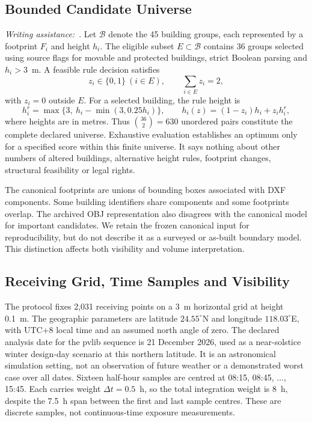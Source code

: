\documentclass{llncs}
\newcommand{\aidraft}{\textit{Writing assistance:}~\cite{openai2026}. }
\begin{document}
\subsection{Bounded Candidate Universe}
\aidraft{}Let $\mathcal{B}$ denote the 45 building groups, each represented by a footprint $F_i$ and height $h_i$. The eligible subset $E\subset\mathcal{B}$ contains 36 groups selected using source flags for movable and protected buildings, strict Boolean parsing and $h_i>3$~m. A feasible rule decision satisfies
\begin{equation}
 z_i\in\{0,1\}\ (i\in E),\qquad \sum_{i\in E}z_i=2,
 \label{eq:select}
\end{equation}
with $z_i=0$ outside $E$. For a selected building, the rule height is
\begin{equation}
 h_i^r=\max\{3,\ h_i-\min(3,0.25h_i)\},\qquad
 h_i(z)=(1-z_i)h_i+z_i h_i^r, \label{eq:height}
\end{equation}
where heights are in metres. Thus $\binom{36}{2}=630$ unordered pairs constitute the complete declared universe. Exhaustive evaluation establishes an optimum only for a specified score within this finite universe. It says nothing about other numbers of altered buildings, alternative height rules, footprint changes, structural feasibility or legal rights.

The canonical footprints are unions of bounding boxes associated with DXF components. Some building identifiers share components and some footprints overlap. The archived OBJ representation also disagrees with the canonical model for important candidates. We retain the frozen canonical input for reproducibility, but do not describe it as a surveyed or as-built boundary model. This distinction affects both visibility and volume interpretation.

\subsection{Receiving Grid, Time Samples and Visibility}
The protocol fixes 2,031 receiving points on a 3~m horizontal grid at height 0.1~m. The geographic parameters are latitude $24.55^\circ$N and longitude $118.03^\circ$E, with UTC+8 local time and an assumed north angle of zero. The declared analysis date for the pvlib sequence is 21 December 2026, used as a near-solstice winter design-day scenario at this northern latitude. It is an astronomical simulation setting, not an observation of future weather or a demonstrated worst case over all dates. Sixteen half-hour samples are centred at 08:15, 08:45, $\ldots$, 15:45. Each carries weight $\Delta t=0.5$~h, so the total integration weight is 8~h, despite the 7.5~h span between the first and last sample centres. These are discrete samples, not continuous-time exposure measurements.
\end{document}
